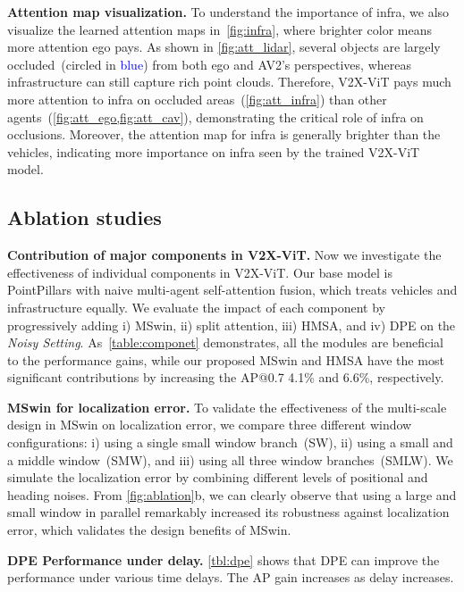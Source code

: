 \documentclass[runningheads]{llncs}
\begin{document}
\noindent\textbf{Attention map visualization. } To understand the importance of infra, we also visualize the learned attention maps in~\cref{fig:infra}, where brighter color means more attention ego pays. As shown in \cref{fig:att_lidar}, several objects are largely occluded~(circled in \textcolor{blue}{blue}) from both ego and AV2's perspectives, whereas infrastructure can still capture rich point clouds. Therefore, V2X-ViT pays much more attention to infra on occluded areas~(\cref{fig:att_infra}) than other agents~(\cref{fig:att_ego,fig:att_cav}), demonstrating the critical role of infra on occlusions. Moreover, the attention map for infra is generally brighter than the vehicles, indicating more importance on infra seen by the trained V2X-ViT model.
\subsection{Ablation studies}
\noindent\textbf{Contribution of major components in V2X-ViT.}
Now we investigate the effectiveness of individual components in V2X-ViT. Our base model is PointPillars with naive multi-agent self-attention fusion, which treats vehicles and infrastructure equally. We evaluate the impact of each component by progressively adding i) MSwin, ii) split attention, iii) HMSA, and iv) DPE on the \textit{Noisy Setting}. As~\cref{table:componet} demonstrates, all the modules are beneficial to the performance gains, while our proposed MSwin and HMSA have the most significant contributions by increasing the AP@0.7 4.1\% and 6.6\%, respectively. 

\noindent\textbf{MSwin for localization error.}
To validate the effectiveness of the multi-scale design in MSwin on localization error, we compare three different window configurations: i) using a single small window branch~(SW), ii) using a small and a middle window~(SMW), and iii) using all three window branches~(SMLW). We simulate the localization error by combining different levels of positional and heading noises. From \cref{fig:ablation}b, we can clearly observe that using a large and small window in parallel remarkably increased its robustness against localization error, which validates the design benefits of MSwin.

\noindent\textbf{DPE Performance under delay.}
\cref{tbl:dpe} shows that DPE can improve the performance under various time delays. The AP gain increases as delay increases. 
\end{document}
